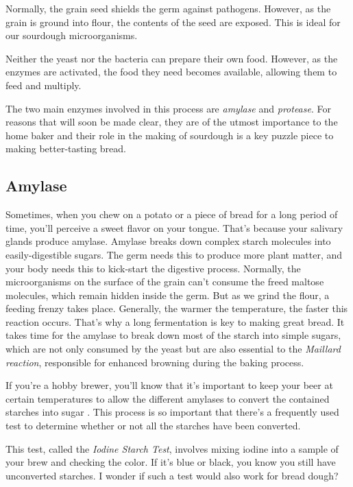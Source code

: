 Normally, the grain seed shields the germ against pathogens. However, as the
grain is ground into flour, the contents of the seed are exposed. This is ideal
for our sourdough microorganisms.

Neither the yeast nor the bacteria can prepare their own food. However, as
the enzymes are activated, the food they need becomes available, allowing them
to feed and multiply.

The two main enzymes involved in this process are \textit{amylase} and
\textit{protease}. For reasons that will soon be made clear, they are of the
utmost importance to the home baker and their role in the making of sourdough
is a key puzzle piece to making better-tasting bread.

\subsection{Amylase}

Sometimes, when you chew on a potato or a piece of bread for a long period
of time, you'll perceive a sweet flavor on your tongue. That's because your
salivary glands produce amylase. Amylase breaks down complex starch molecules
into easily-digestible sugars. The germ needs this to produce more plant
matter, and your body needs this to kick-start the digestive process. Normally,
the microorganisms on the surface of the grain can't consume the freed maltose
molecules, which remain hidden inside the germ. But as we grind the flour, a
feeding frenzy takes place. Generally, the warmer the temperature, the faster
this reaction occurs. That's why a long fermentation is key to making great
bread. It takes time for the amylase to break down most of the starch into
simple sugars, which are not only consumed by the yeast but are also essential
to the \textit{Maillard reaction}, responsible for enhanced browning during the
baking process.

If you're a hobby brewer, you'll know that it's important to keep your beer at
certain temperatures to allow the different amylases to convert the contained
starches into sugar \cite{beer+amylase}. This process is so important that
there's a frequently used test to determine whether or not all the starches
have been converted.

This test, called the \textit{Iodine Starch Test}, involves mixing iodine into
a sample of your brew and checking the color. If it's blue or black, you know
you still have unconverted starches. I wonder if such a test would also work
for bread dough?

